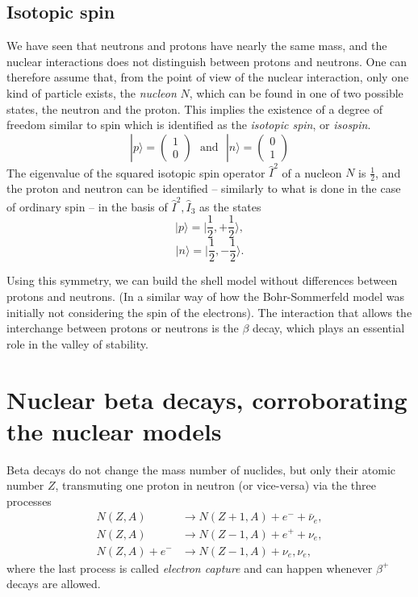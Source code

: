 \subsection{Isotopic spin}
We have seen that neutrons and protons have nearly the same mass, and the nuclear interactions does not distinguish between protons and neutrons.
One can therefore assume that, from the point of view of the nuclear interaction, only one kind of particle exists, the \textit{nucleon} $N$, which can be found in one of two possible states, the neutron and the proton. This implies the existence of a degree of freedom similar to spin which is identified as the \emph{isotopic spin}, or \emph{isospin}.
\begin{equation*}
    |p\rangle = \left(\begin{array}{c}
    1 \\
    0
    \end{array}\right) \,\,\,\, \text{and} \,\,\,\, |n\rangle = \left(\begin{array}{c}
    0 \\
    1
    \end{array}\right)
\end{equation*}
The eigenvalue of the squared isotopic spin operator \(\hat{I}^2\) of a nucleon $N$ is $\frac{1}{2}$, and the proton and neutron can be identified -- similarly to what is done in the case of ordinary spin -- in the basis of \(\hat{I}^2,\hat{I}_3\) as the states
\begin{equation*}
    |p\rangle = |\frac{1}{2}, +\frac{1}{2}\rangle,
\end{equation*}
\begin{equation*}
    |n\rangle = |\frac{1}{2}, -\frac{1}{2}\rangle.
\end{equation*}

Using this symmetry, we can build the shell model without differences between protons and neutrons. (In a similar way of how the Bohr-Sommerfeld model was initially not considering the spin of the electrons). The interaction that allows the interchange between protons or neutrons is the $\beta$ decay, which plays an essential role in the valley of stability.

\section{Nuclear beta decays, corroborating the nuclear models}
\label{sec:NuclearBeta}
Beta decays do not change the mass number of nuclides, but only their atomic number \(Z\), transmuting one proton in neutron (or vice-versa) via the three processes
\begin{align*}
    N(Z,A) &\to N(Z+1, A) + e^- + \bar{\nu}_e,\\
    N(Z,A) &\to N(Z-1, A) + e^+ + \nu_e,\\
    N(Z,A) + e^{-} &\to N(Z-1, A) + \nu_e, \nu_e,
\end{align*}
where the last process is called \emph{electron capture} and can happen whenever \(\beta^+\) decays are allowed.

